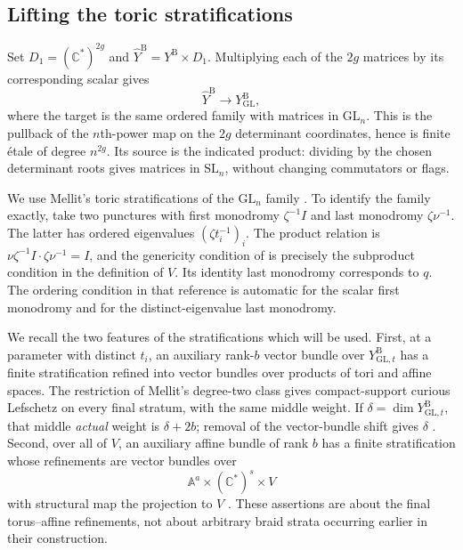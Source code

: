 \subsection{Lifting the toric stratifications}

Set $D_1=(\mathbb C^*)^{2g}$ and
$\widehat Y^{\mathrm B}=Y^{\mathrm B}\times D_1$.
Multiplying each of the $2g$ matrices by its corresponding scalar gives
\begin{equation}\label{betti:cover}
 \widehat Y^{\mathrm B}\longrightarrow Y^{\mathrm B}_{\mathrm{GL}},
\end{equation}
where the target is the same ordered family with matrices in
$\mathrm{GL}_n$.  This is the pullback of the $n$th-power map on the
$2g$ determinant coordinates, hence is finite \'etale of degree
$n^{2g}$.  Its source is the indicated product: dividing by the chosen
determinant roots gives matrices in $\mathrm{SL}_n$, without changing
commutators or flags.

We use Mellit's toric stratifications of the $\mathrm{GL}_n$ family
\cite{Mellit2025}.  To identify the family exactly, take two punctures
with first monodromy $\zeta^{-1}I$ and last monodromy
$\zeta\nu^{-1}$.  The latter has ordered eigenvalues
$(\zeta t_i^{-1})_i$.  The product relation is
$\nu\zeta^{-1}I\cdot\zeta\nu^{-1}=I$, and the genericity condition of
\cite[Definition~4.9]{Mellit2025} is precisely the subproduct condition
in the definition of $V$.  Its identity last monodromy corresponds to
$q$.  The ordering condition in that reference is automatic for the
scalar first monodromy and for the distinct-eigenvalue last monodromy.

We recall the two features of the stratifications which will be used.
First, at a parameter with distinct $t_i$, an auxiliary rank-$b$ vector
bundle over $Y^{\mathrm B}_{\mathrm{GL},t}$ has a finite stratification
refined into vector bundles over products of tori and affine spaces.
The restriction of
Mellit's degree-two class gives compact-support curious Lefschetz on
every final stratum, with the same middle weight.  If
$\delta=\dim Y^{\mathrm B}_{\mathrm{GL},t}$, that middle \emph{actual}
weight is $\delta+2b$; removal of the vector-bundle shift gives
$\delta$ \cite[Theorem~6.14, Section~7.4, and Theorem~7.5]{Mellit2025}.
Second, over all of $V$, an auxiliary affine bundle of rank $b$ has a
finite stratification whose refinements are vector bundles over
\[
 \mathbb A^a\times(\mathbb C^*)^s\times V
\]
with structural map the projection to $V$
\cite[proof of Proposition~8.7]{Mellit2025}.
These assertions are about the final torus--affine refinements, not
about arbitrary braid strata occurring earlier in their construction.

